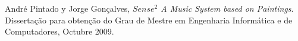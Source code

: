 \begin{thebibliography}{9}
  André Pintado y Jorge Gonçalves,
  \emph{$Sense^{2}$ A Music System based on Paintings}.
  Dissertação para obtenção do Grau de Mestre em Engenharia Informática e de Computadores,
  Octubre 2009.
\end{thebibliography}